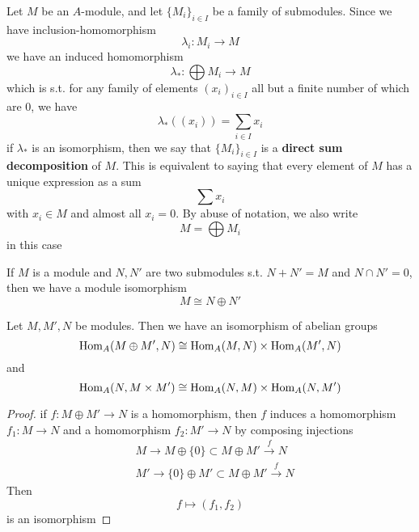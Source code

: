 \documentclass[11pt]{article}
\begin{document}
Let \(M\) be an \(A\)-module, and let \(\{M_i\}_{i\in I}\) be a family of submodules. Since we have
inclusion-homomorphism
\begin{equation*}
\lambda_i:M_i\to M
\end{equation*}
we have an induced homomorphism
\begin{equation*}
\lambda_*:\bigoplus M_i\to M
\end{equation*}
which is s.t. for any family of elements \((x_i)_{i\in I}\) all but a finite number of which are 0,
we have
\begin{equation*}
\lambda_*((x_i))=\sum_{i\in I}x_i
\end{equation*}
if \(\lambda_*\) is an isomorphism, then we say that \(\{M_i\}_{i\in I}\) is a \textbf{direct sum decomposition}
of \(M\). This is equivalent to saying that every element of \(M\) has a unique expression as a
sum
\begin{equation*}
\sum x_i
\end{equation*}
with \(x_i\in M\) and almost all \(x_i=0\). By abuse of notation, we also write
\begin{equation*}
M=\bigoplus M_i
\end{equation*}
in this case

If \(M\) is a module and \(N,N'\) are two submodules s.t. \(N+N'=M\) and \(N\cap N'=0\), then we
have a module isomorphism
\begin{equation*}
M\cong N\oplus N'
\end{equation*}
\begin{proposition}[]
Let \(M,M',N\) be modules. Then we have an isomorphism of abelian groups
\begin{equation*}
\operatorname{Hom}_A(M\oplus M',N)\cong\operatorname{Hom}_A(M,N)\times\operatorname{Hom}_A(M',N)
\end{equation*}
and
\begin{equation*}
\operatorname{Hom}_A(N,M\times M')\cong\operatorname{Hom}_A(N,M)\times\operatorname{Hom}_A(N,M')
\end{equation*}
\end{proposition}

\begin{proof}
if \(f:M\oplus M'\to N\) is a homomorphism, then \(f\) induces a homomorphism \(f_1:M\to N\) and a
homomorphism \(f_2:M'\to N\) by composing injections
\begin{align*}
&M\to M\oplus\{0\}\subset M\oplus M'\xrightarrow{f}N\\
&M'\to\{0\}\oplus M'\subset M\oplus M'\xrightarrow{f}N
\end{align*}
Then
\begin{equation*}
f\mapsto(f_1,f_2)
\end{equation*}
is an isomorphism
\end{proof}
\end{document}
